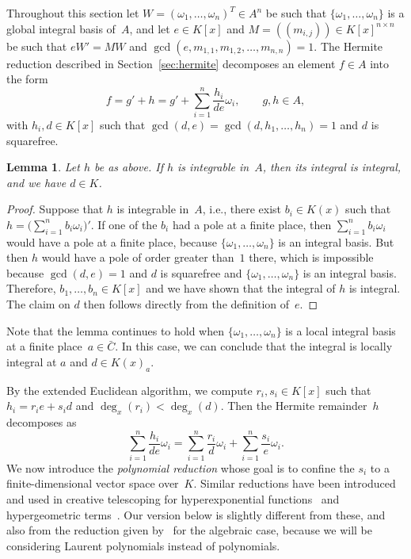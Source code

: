 \documentclass[final,1p,times,authoryear]{elsarticle}
\newtheorem{lemma}[theorem]{Lemma}
\begin{document}
Throughout this section let $W=(\omega_1,\ldots,\omega_n)^T\in A^n$ be such
that $\{\omega_1, \ldots, \omega_n\}$ is a global integral basis of~$A$, and
let $e\in K[x]$ and $M=((m_{i,j}))\in K[x]^{n\times n}$ be such that $eW'=MW$
and $\gcd(e, m_{1, 1}, m_{1, 2}, \ldots, m_{n ,n})=1$. The Hermite reduction
described in Section~\ref{sec:hermite} decomposes an element $f\in A$ into
the form
\[
  f = g' + h = g' + \sum_{i=1}^n \frac{h_i}{de} \omega_i,\qquad
  g, h\in A,
\]
with $h_i, d\in K[x]$ such that $\gcd(d, e)=\gcd(d,h_1,\dots,h_n)=1$ and $d$ is squarefree.
\begin{lemma}\label{LEM:d}
  Let $h$ be as above. If $h$ is integrable in~$A$,
  then its integral is integral, and we have $d\in K$.
\end{lemma}
\begin{proof}
  Suppose that $h$ is integrable in~$A$, i.e., there exist $b_i\in K(x)$
  such that $h = \bigl(\sum_{i=1}^n b_i \omega_i\bigr)'$.
  If one of the $b_i$ had a pole at a finite place, then $\sum_{i=1}^n b_i\omega_i$
  would have a pole at a finite place, because $\{\omega_1,\dots,\omega_n\}$ is
  an integral basis. But then $h$ would have a pole of order greater than~$1$
  there, which is impossible because $\gcd(d,e)=1$ and $d$ is squarefree and
  $\{\omega_1,\dots,\omega_n\}$ is an integral basis.
  Therefore, $b_1,\dots,b_n\in K[x]$ and we have shown that the integral of $h$
  is integral. The claim on $d$ then follows directly from the definition of~$e$.
\end{proof}

Note that the lemma continues to hold when $\{\omega_1,\dots,\omega_n\}$ is
a local integral basis at a finite place~$a\in\bar C$. In this case, we can conclude
that the integral is locally integral at $a$ and $d\in K(x)_a$. 

By the extended Euclidean algorithm, we compute $r_i, s_i\in K[x]$ such that
$h_i = r_i e + s_i d$ and $\deg_x(r_i) < \deg_x(d)$. Then the Hermite remainder~$h$
decomposes as
\begin{equation}\label{EQ:h}
  \sum_{i=1}^n \frac{h_i}{de}\omega_i =
  \sum_{i=1}^n \frac{r_i}{d}\omega_i +
  \sum_{i=1}^n \frac{s_i}{e}\omega_i.
\end{equation}
We now introduce the \emph{polynomial reduction} whose goal is to confine the $s_i$ to a finite-dimensional
vector space over~$K$. Similar reductions have been introduced and used in creative telescoping
for hyperexponential functions~\citep{bostan13a} and hypergeometric terms~\citep{chen15a}.
Our version below is slightly different from these, and also from the reduction given by~\cite{chen16} for
the algebraic case, because we will be considering Laurent polynomials instead of polynomials.
\end{document}
